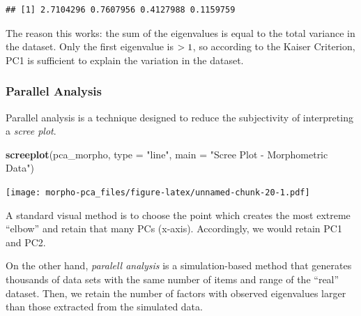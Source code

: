 \documentclass[]{article}
\newenvironment{Shaded}{\begin{snugshade}}{\end{snugshade}}
\newcommand{\DataTypeTok}[1]{\textcolor[rgb]{0.13,0.29,0.53}{#1}}
\newcommand{\DecValTok}[1]{\textcolor[rgb]{0.00,0.00,0.81}{#1}}
\newcommand{\KeywordTok}[1]{\textcolor[rgb]{0.13,0.29,0.53}{\textbf{#1}}}
\newcommand{\NormalTok}[1]{#1}
\newcommand{\OperatorTok}[1]{\textcolor[rgb]{0.81,0.36,0.00}{\textbf{#1}}}
\newcommand{\StringTok}[1]{\textcolor[rgb]{0.31,0.60,0.02}{#1}}
\begin{document}
\begin{Shaded}
\end{Shaded}

\begin{verbatim}
## [1] 2.7104296 0.7607956 0.4127988 0.1159759
\end{verbatim}

The reason this works: the sum of the eigenvalues is equal to the total
variance in the dataset. Only the first eigenvalue is \(\small >1\), so
according to the Kaiser Criterion, PC1 is sufficient to explain the
variation in the dataset.

\hypertarget{parallel-analysis}{%
\subsubsection{Parallel Analysis}\label{parallel-analysis}}

Parallel analysis is a technique designed to reduce the subjectivity of
interpreting a \emph{scree plot}.

\begin{Shaded}
\begin{Highlighting}[]
\KeywordTok{screeplot}\NormalTok{(pca_morpho, }\DataTypeTok{type =} \StringTok{"line"}\NormalTok{, }\DataTypeTok{main =} \StringTok{"Scree Plot - Morphometric Data"}\NormalTok{)}
\end{Highlighting}
\end{Shaded}

\texttt{[image: morpho-pca\_files/figure-latex/unnamed-chunk-20-1.pdf]}

A standard visual method is to choose the point which creates the most
extreme ``elbow'' and retain that many PCs (x-axis). Accordingly, we
would retain PC1 and PC2.

On the other hand, \emph{paralell analysis} is a simulation-based method
that generates thousands of data sets with the same number of items and
range of the ``real'' dataset. Then, we retain the number of factors
with observed eigenvalues larger than those extracted from the simulated
data.
\end{document}
